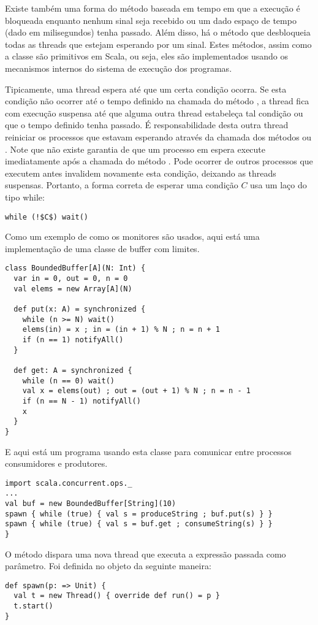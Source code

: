 Existe também uma forma do método  baseada em tempo em que a
execução é bloqueada enquanto nenhum sinal seja recebido ou um dado espaço de tempo (dado em
milisegundos) tenha passado. Além disso, há o método  que desbloqueia todas
as threads que estejam esperando por um sinal. Estes métodos, assim como a classe  
são primitivos em Scala, ou seja, eles são implementados usando os mecanismos internos do sistema de execução
dos programas.

Tipicamente, uma thread espera até que um certa condição ocorra. 
Se esta condição não ocorrer até o tempo definido na chamada do método , 
a thread fica com execução suspensa até que alguma outra thread estabeleça tal condição
ou que o tempo definido tenha passado. É responsabilidade desta outra thread reiniciar
os processos que estavam esperando através da chamada dos métodos  ou . 
Note que não existe garantia de que um processo em espera execute imediatamente após a chamada do método
. Pode ocorrer de outros processos que executem antes invalidem novamente esta condição,
deixando as threads suspensas.  Portanto, a forma correta de esperar uma condição $C$ usa um laço do tipo while:
\begin{lstlisting}
while (!$C$) wait()
\end{lstlisting}

Como um exemplo de como os monitores são usados, aqui está uma implementação de uma classe de buffer com limites.
\begin{lstlisting}
class BoundedBuffer[A](N: Int) {
  var in = 0, out = 0, n = 0
  val elems = new Array[A](N)

  def put(x: A) = synchronized {
    while (n >= N) wait()
    elems(in) = x ; in = (in + 1) % N ; n = n + 1
    if (n == 1) notifyAll()
  }

  def get: A = synchronized {
    while (n == 0) wait()
    val x = elems(out) ; out = (out + 1) % N ; n = n - 1
    if (n == N - 1) notifyAll()
    x
  }
}
\end{lstlisting}
E aqui está um programa usando esta classe para comunicar entre processos
consumidores e produtores.
\begin{lstlisting}
import scala.concurrent.ops._
...
val buf = new BoundedBuffer[String](10)
spawn { while (true) { val s = produceString ; buf.put(s) } }
spawn { while (true) { val s = buf.get ; consumeString(s) } }
}
\end{lstlisting}
O método  dispara uma nova thread que executa a expressão passada como
parâmetro. Foi definida no objeto  da seguinte maneira:
\begin{lstlisting}
def spawn(p: => Unit) {
  val t = new Thread() { override def run() = p }
  t.start()
}
\end{lstlisting}

